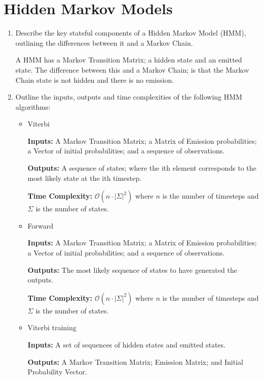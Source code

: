 \documentclass[10pt,\jkfside,a4paper]{article}
\begin{document}
\section{Hidden Markov Models}

\begin{enumerate}

    \item Describe the key stateful components of a Hidden Markov Model (HMM), outlining the differences between it and a Markov Chain.

    A HMM has a Markov Transition Matrix; a hidden state and an emitted state. The difference between this and a Markov Chain; is that the Markov Chain state is not hidden and there is no emission.

    \item Outline the inputs, outputs and time complexities of the following HMM algorithms:

    \begin{itemize}

        \item Viterbi

        \textbf{Inputs:} A Markov Transition Matrix; a Matrix of Emission probabilities; a Vector of initial probabilities; and a sequence of observations.

        \textbf{Outputs:} A sequence of states; where the ith element corresponds to the most likely state at the ith timestep.

        \textbf{Time Complexity:} $\mathcal O(n \cdot |\Sigma|^2)$ where $n$ is the number of timesteps and $\Sigma$ is the number of states.

        \item Forward

        \textbf{Inputs:} A Markov Transition Matrix; a Matrix of Emission probabilities; a Vector of initial probabilities; and a sequence of observations.

        \textbf{Outputs:} The most likely sequence of states to have generated the outputs.

        \textbf{Time Complexity:} $\mathcal O(n \cdot |\Sigma|^2)$ where $n$ is the number of timesteps and $\Sigma$ is the number of states.

        \item Viterbi training

        \textbf{Inputs:} A set of sequences of hidden states and emitted states.

        \textbf{Outputs:} A Markov Transition Matrix; Emission Matrix; and Initial Probability Vector.


\end{itemize}
\end{enumerate}
\end{document}
